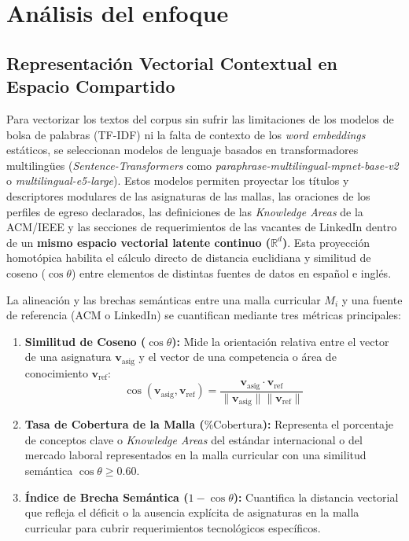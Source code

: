 \section{Análisis del enfoque}
\label{cap:approachAnalysis}

\subsection{Representación Vectorial Contextual en Espacio Compartido}
\label{sec:nlp_representation}

Para vectorizar los textos del corpus sin sufrir las limitaciones de los modelos de bolsa de palabras (TF-IDF) ni la falta de contexto de los \textit{word embeddings} estáticos, se seleccionan modelos de lenguaje basados en transformadores multilingües (\textit{Sentence-Transformers} como \textit{paraphrase-multilingual-mpnet-base-v2} o \textit{multilingual-e5-large}). Estos modelos permiten proyectar los títulos y descriptores modulares de las asignaturas de las mallas, las oraciones de los perfiles de egreso declarados, las definiciones de las \textit{Knowledge Areas} de la ACM/IEEE y las secciones de requerimientos de las vacantes de LinkedIn dentro de un \textbf{mismo espacio vectorial latente continuo ($\mathbb{R}^d$)}. Esta proyección homotópica habilita el cálculo directo de distancia euclidiana y similitud de coseno ($\cos \theta$) entre elementos de distintas fuentes de datos en español e inglés.

La alineación y las brechas semánticas entre una malla curricular $M_i$ y una fuente de referencia (ACM o LinkedIn) se cuantifican mediante tres métricas principales:
\begin{enumerate}[label=\alph*)]
	\item \textbf{Similitud de Coseno ($\cos \theta$):} Mide la orientación relativa entre el vector de una asignatura $\mathbf{v}_{\text{asig}}$ y el vector de una competencia o área de conocimiento $\mathbf{v}_{\text{ref}}$:
	      \begin{equation}
		      \cos(\mathbf{v}_{\text{asig}}, \mathbf{v}_{\text{ref}}) = \frac{\mathbf{v}_{\text{asig}} \cdot \mathbf{v}_{\text{ref}}}{\|\mathbf{v}_{\text{asig}}\| \|\mathbf{v}_{\text{ref}}\|}
	      \end{equation}
	\item \textbf{Tasa de Cobertura de la Malla ($\% \text{Cobertura}$):} Representa el porcentaje de conceptos clave o \textit{Knowledge Areas} del estándar internacional o del mercado laboral representados en la malla curricular con una similitud semántica $\cos \theta \ge 0.60$.
	\item \textbf{Índice de Brecha Semántica ($1 - \cos \theta$):} Cuantifica la distancia vectorial que refleja el déficit o la ausencia explícita de asignaturas en la malla curricular para cubrir requerimientos tecnológicos específicos.
\end{enumerate}


